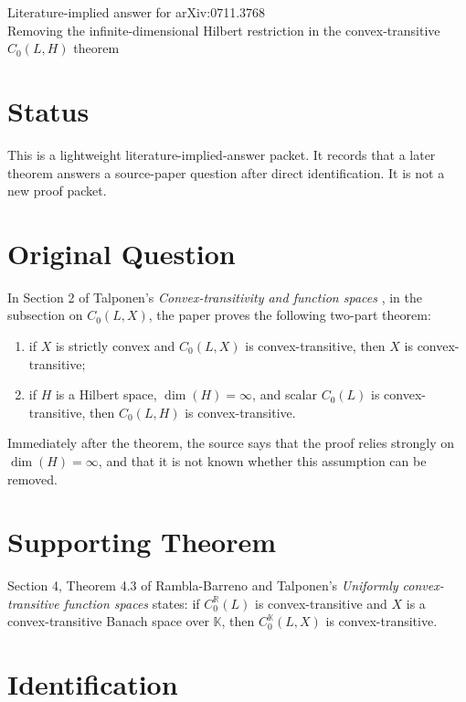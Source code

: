 \documentclass[11pt]{article}
\newcommand{\R}{\mathbb R}
\newcommand{\K}{\mathbb K}
\begin{document}
\begin{center}
{\Large Literature-implied answer for arXiv:0711.3768}\\[4pt]
{\normalsize Removing the infinite-dimensional Hilbert restriction in the
convex-transitive \(C_0(L,H)\) theorem}
\end{center}

\section*{Status}

This is a lightweight literature-implied-answer packet.  It records that a
later theorem answers a source-paper question after direct identification.  It
is not a new proof packet.

\section*{Original Question}

In Section 2 of Talponen's \emph{Convex-transitivity and function spaces}
\cite{Talponen2007}, in the subsection on \(C_0(L,X)\), the paper proves the
following two-part theorem:
\begin{enumerate}
\item if \(X\) is strictly convex and \(C_0(L,X)\) is convex-transitive, then
  \(X\) is convex-transitive;
\item if \(H\) is a Hilbert space, \(\dim(H)=\infty\), and scalar \(C_0(L)\)
  is convex-transitive, then \(C_0(L,H)\) is convex-transitive.
\end{enumerate}
Immediately after the theorem, the source says that the proof relies strongly
on \(\dim(H)=\infty\), and that it is not known whether this assumption can be
removed.

\section*{Supporting Theorem}

Section 4, Theorem 4.3 of Rambla-Barreno and Talponen's
\emph{Uniformly convex-transitive function spaces} \cite{RT2009} states:
if \(C_0^{\R}(L)\) is convex-transitive and \(X\) is a convex-transitive Banach
space over \(\K\), then \(C_0^{\K}(L,X)\) is convex-transitive.

\section*{Identification}
\end{document}
